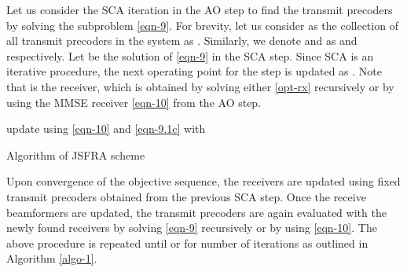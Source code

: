 Let us consider the  \ac{SCA} iteration in the  \ac{AO} step to find the transmit precoders by solving the subproblem \eqref{eqn-9}. For brevity, let us consider  as the collection of all transmit precoders in the system as . Similarly, we denote  and \eqn{\mbfa{\beta}} as  and  respectively. Let  be the solution of \eqref{eqn-9} in the  \ac{SCA} step. Since \ac{SCA} is an iterative procedure, the next operating point  for the  step is updated as . Note that  is the receiver, which is obtained by solving either \eqref{opt-rx} recursively or by using the \ac{MMSE} receiver \eqref{eqn-10} from the  \ac{AO} step.
\begin{algorithm}
	\SetAlgoLined
	\DontPrintSemicolon
	\BlankLine
	update  using \eqref{eqn-10} and \eqref{eqn-9.1c} with  \;
	\caption{Algorithm of \acs{JSFRA} scheme}
	\label{algo-1} 
\end{algorithm}
	
Upon convergence of the objective sequence, the receivers are updated using fixed transmit precoders  obtained from the previous \ac{SCA} step. Once the receive beamformers are updated, the transmit precoders are again evaluated with the newly found receivers by solving \eqref{eqn-9} recursively or by using \eqref{eqn-10}. The above procedure is repeated until  or for  number of iterations as outlined in Algorithm \ref{algo-1}.

